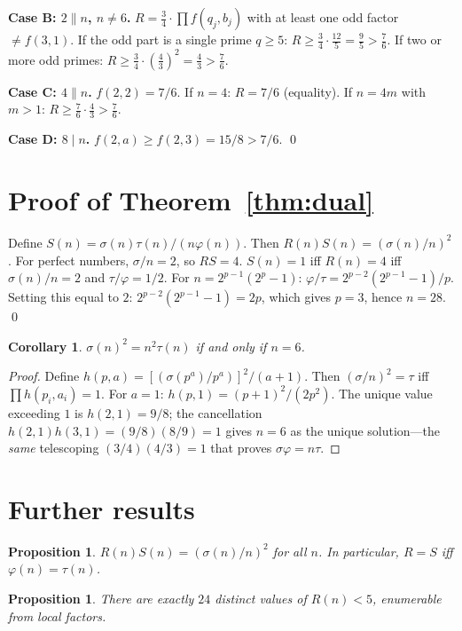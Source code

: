 \documentclass[11pt]{amsart}
\newtheorem{proposition}[theorem]{Proposition}
\newtheorem{corollary}[theorem]{Corollary}
\theoremstyle{remark}
\begin{document}
\textbf{Case B: $2 \| n$, $n \neq 6$.}
$R = \frac{3}{4} \cdot \prod f(q_j, b_j)$ with at least one odd factor $\neq f(3,1)$.
If the odd part is a single prime $q \geq 5$: $R \geq \frac{3}{4} \cdot \frac{12}{5} = \frac{9}{5} > \frac{7}{6}$.
If two or more odd primes: $R \geq \frac{3}{4} \cdot \left(\frac{4}{3}\right)^2 = \frac{4}{3} > \frac{7}{6}$.

\textbf{Case C: $4 \| n$.}
$f(2,2) = 7/6$. If $n=4$: $R = 7/6$ (equality). If $n = 4m$ with $m > 1$:
$R \geq \frac{7}{6} \cdot \frac{4}{3} > \frac{7}{6}$.

\textbf{Case D: $8 \mid n$.}
$f(2,a) \geq f(2,3) = 15/8 > 7/6$. \qed

\section{Proof of Theorem~\ref{thm:dual}}

Define $S(n) = \sigma(n)\tau(n)/(n\varphi(n))$. Then $R(n)S(n) = (\sigma(n)/n)^2$.
For perfect numbers, $\sigma/n = 2$, so $RS = 4$.
$S(n) = 1$ iff $R(n) = 4$ iff $\sigma(n)/n = 2$ and $\tau/\varphi = 1/2$.
For $n = 2^{p-1}(2^p-1)$: $\varphi/\tau = 2^{p-2}(2^{p-1}-1)/p$.
Setting this equal to $2$: $2^{p-2}(2^{p-1}-1) = 2p$, which gives $p = 3$,
hence $n = 28$.  \qed

\begin{corollary}\label{cor:sigma-squared}
$\sigma(n)^2 = n^2 \tau(n)$ if and only if $n = 6$.
\end{corollary}

\begin{proof}
Define $h(p,a) = [(\sigma(p^a)/p^a)]^2/(a+1)$.
Then $(\sigma/n)^2 = \tau$ iff $\prod h(p_i,a_i) = 1$.
For $a=1$: $h(p,1) = (p+1)^2/(2p^2)$.
The unique value exceeding $1$ is $h(2,1) = 9/8$;
the cancellation $h(2,1) h(3,1) = (9/8)(8/9) = 1$
gives $n = 6$ as the unique solution---the \emph{same}
telescoping $(3/4)(4/3) = 1$ that proves $\sigma\varphi = n\tau$.
\end{proof}

\section{Further results}

\begin{proposition}
$R(n)S(n) = (\sigma(n)/n)^2$ for all $n$. In particular, $R = S$ iff $\varphi(n) = \tau(n)$.
\end{proposition}

\begin{proposition}
There are exactly $24$ distinct values of $R(n) < 5$, enumerable from local factors.
\end{proposition}
\end{document}
